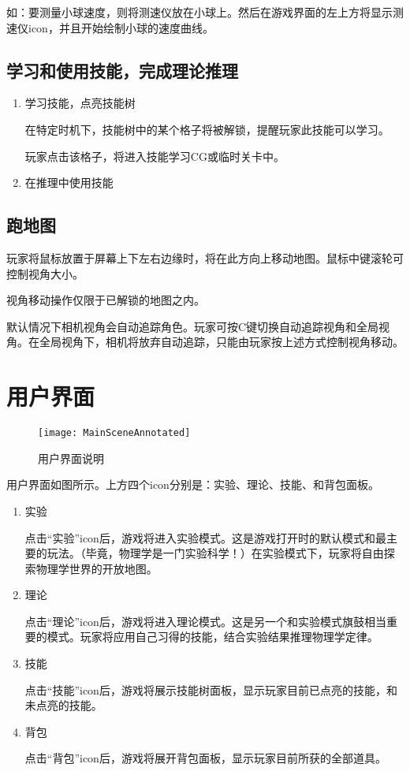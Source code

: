\documentclass{tstextbook}
\begin{document}
如：要测量小球速度，则将测速仪放在小球上。然后在游戏界面的左上方将显示测速仪icon，并且开始绘制小球的速度曲线。

\subsection{学习和使用技能，完成理论推理}

\begin{enumerate}

\item{学习技能，点亮技能树}

在特定时机下，技能树中的某个格子将被解锁，提醒玩家此技能可以学习。

玩家点击该格子，将进入技能学习CG或临时关卡中。

\item{在推理中使用技能}

\end{enumerate}

\subsection{跑地图}

玩家将鼠标放置于屏幕上下左右边缘时，将在此方向上移动地图。鼠标中键滚轮可控制视角大小。

视角移动操作仅限于已解锁的地图之内。

默认情况下相机视角会自动追踪角色。玩家可按C键切换自动追踪视角和全局视角。在全局视角下，相机将放弃自动追踪，只能由玩家按上述方式控制视角移动。

\section{用户界面}

\begin{figure}[H]
\centering
\texttt{[image: MainSceneAnnotated]} 
\caption{用户界面说明}
\label{MainScene}
\end{figure}

用户界面如图所示。上方四个icon分别是：实验、理论、技能、和背包面板。

\begin{enumerate}

\item{实验}

点击“实验”icon后，游戏将进入实验模式。这是游戏打开时的默认模式和最主要的玩法。（毕竟，物理学是一门实验科学！）在实验模式下，玩家将自由探索物理学世界的开放地图。

\item{理论}

点击“理论”icon后，游戏将进入理论模式。这是另一个和实验模式旗鼓相当重要的模式。玩家将应用自己习得的技能，结合实验结果推理物理学定律。

\item{技能}

点击“技能”icon后，游戏将展示技能树面板，显示玩家目前已点亮的技能，和未点亮的技能。

\item{背包}

点击“背包”icon后，游戏将展开背包面板，显示玩家目前所获的全部道具。

\end{enumerate}
\end{document}

